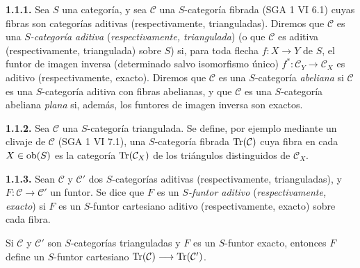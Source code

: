 \textbf{1.1.1.} Sea \(S\) una categoría, y sea \(\mathcal C\) una \(S\)-categoría fibrada (SGA 1 VI 6.1) cuyas fibras son categorías aditivas (respectivamente, trianguladas). Diremos que \(\mathcal C\) es una \emph{\(S\)-categoría aditiva} (\emph{respectivamente, triangulada}) (o que \(\mathcal C\) es aditiva (respectivamente, triangulada) sobre \(S\)) si, para toda flecha \(f:X\to Y\) de \(S\), el funtor de imagen inversa (determinado salvo isomorfismo único) \(f^*:\mathcal C_Y\longrightarrow \mathcal C_X\) es aditivo (respectivamente, exacto). Diremos que \(\mathcal C\) es una \(S\)-categoría \emph{abeliana} si \(\mathcal C\) es una \(S\)-categoría aditiva con fibras abelianas, y que \(\mathcal C\) es una \(S\)-categoría abeliana \emph{plana} si, además, los funtores de imagen inversa son exactos.

\textbf{1.1.2.} Sea \(\mathcal C\) una \(S\)-categoría triangulada. Se define, por ejemplo mediante un clivaje de \(\mathcal C\) (SGA 1 VI 7.1), una \(S\)-categoría fibrada \(\operatorname{Tr}(\mathcal C)\) cuya fibra en cada \(X\in \operatorname{ob}(S)\) es la categoría \(\operatorname{Tr}(\mathcal C_X)\) de los triángulos distinguidos de \(\mathcal C_X\).

\textbf{1.1.3.} Sean \(\mathcal C\) y \(\mathcal C'\) dos \(S\)-categorías aditivas (respectivamente, trianguladas), y \(F:\mathcal C\to\mathcal C'\) un funtor. Se dice que \(F\) es un \emph{\(S\)-funtor aditivo} (\emph{respectivamente, exacto}) si \(F\) es un \(S\)-funtor cartesiano aditivo (respectivamente, exacto) sobre cada fibra.



\providecommand{\cC}{\mathcal C}
\providecommand{\cD}{\mathcal D}
\providecommand{\cK}{\mathcal K}
\providecommand{\cO}{\mathcal O}
\providecommand{\cS}{\mathcal S}
\providecommand{\Cpx}{\mathrm C}
\providecommand{\Kpx}{\mathrm K}
\providecommand{\Dpx}{\mathrm D}
\providecommand{\D}{\mathrm D}
\providecommand{\Ho}{\mathrm H}
\providecommand{\RHom}{\mathrm R\!\operatorname{Hom}}
\providecommand{\Ob}{\operatorname{ob}}
\providecommand{\Coker}{\operatorname{Coker}}
\providecommand{\Ker}{\operatorname{Ker}}
\providecommand{\Im}{\operatorname{Im}}
\providecommand{\Hom}{\operatorname{Hom}}
\providecommand{\Cone}{\operatorname{Cone}}
\providecommand{\id}{\operatorname{Id}}
\providecommand{\qis}{\xrightarrow{\sim}}


Si \(\mathcal C\) y \(\mathcal C'\) son \(S\)-categorías trianguladas y \(F\) es un \(S\)-funtor exacto, entonces \(F\) define un \(S\)-funtor cartesiano \(\operatorname{Tr}(\mathcal C)\longrightarrow \operatorname{Tr}(\mathcal C')\).

